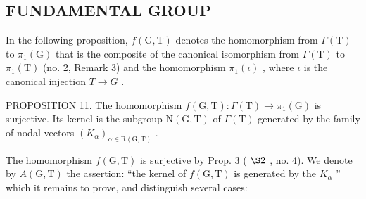 \subsection{FUNDAMENTAL GROUP}

In the following proposition, \(f(\mathrm{G},\mathrm{T})\) denotes the homomorphism from \(\varGamma(\mathrm{T})\) to \(\pi_{1}(\mathrm{G})\) that is the composite of the canonical isomorphism from \(\varGamma(\mathrm{T})\) to \(\pi_{1}(\mathrm{T})\) (no. 2, Remark 3) and the homomorphism \(\pi_{1}(\iota)\) , where \(\iota\) is the canonical injection \(T\to G\) .

PROPOSITION 11. The homomorphism \(f(\mathrm{G},\mathrm{T}) : \Gamma(\mathrm{T}) \to \pi_1(\mathrm{G})\) is surjective. Its kernel is the subgroup \(\mathrm{N}(\mathrm{G},\mathrm{T})\) of \(\Gamma(\mathrm{T})\) generated by the family of nodal vectors \((K_{\alpha})_{\alpha \in \mathrm{R}(\mathrm{G},\mathrm{T})}\) .

The homomorphism \(f(\mathrm{G},\mathrm{T})\) is surjective by Prop. 3 ( \(\S2\) , no. 4). We denote by \(A(\mathrm{G},\mathrm{T})\) the assertion: ``the kernel of \(f(\mathrm{G},\mathrm{T})\) is generated by the \(K_{\alpha}\) '' which it remains to prove, and distinguish several cases:

